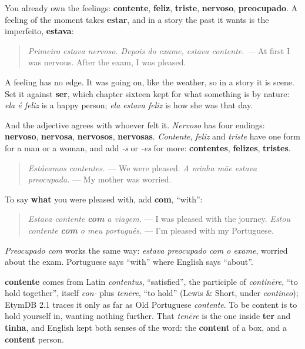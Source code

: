 \begin{grammarlens}[title={Grammar Lens: a feeling is scene, and it takes estar}]
You already own the feelings: \textbf{contente}, \textbf{feliz}, \textbf{triste}, \textbf{nervoso}, \textbf{preocupado}. A feeling of the moment takes \textbf{estar}, and in a story the past it wants is the imperfeito, \textbf{estava}:

\begin{quote}
\emph{Primeiro estava nervoso. Depois do exame, estava contente.} — At first I was nervous. After the exam, I was pleased.
\end{quote}

A feeling has no edge. It was going on, like the weather, so in a story it is scene. Set it against \textbf{ser}, which chapter sixteen kept for what something is by nature: \emph{ela é feliz} is a happy person; \emph{ela estava feliz} is how she was that day.

And the adjective agrees with whoever felt it. \emph{Nervoso} has four endings: \textbf{nervoso}, \textbf{nervosa}, \textbf{nervosos}, \textbf{nervosas}. \emph{Contente}, \emph{feliz} and \emph{triste} have one form for a man or a woman, and add \emph{-s} or \emph{-es} for more: \textbf{contentes}, \textbf{felizes}, \textbf{tristes}.

\begin{quote}
\emph{Estávamos contentes.} — We were pleased. \emph{A minha mãe estava preocupada.} — My mother was worried.
\end{quote}
\end{grammarlens}

\begin{grammarlens}[title={Grammar Lens: contente com}]
To say \textbf{what} you were pleased with, add \textbf{com}, \textquotedblleft{}with\textquotedblright{}:

\begin{quote}
\emph{Estava contente \textbf{com} a viagem.} — I was pleased with the journey. \emph{Estou contente \textbf{com} o meu português.} — I'm pleased with my Portuguese.
\end{quote}

\emph{Preocupado com} works the same way: \emph{estava preocupado com o exame}, worried about the exam. Portuguese says \textquotedblleft{}with\textquotedblright{} where English says \textquotedblleft{}about\textquotedblright{}.
\end{grammarlens}

\begin{cousinweb}
\textbf{contente} comes from Latin \emph{contentus}, \textquotedblleft{}satisfied\textquotedblright{}, the participle of \emph{continēre}, \textquotedblleft{}to hold together\textquotedblright{}, itself \emph{con-} plus \emph{tenēre}, \textquotedblleft{}to hold\textquotedblright{} (Lewis \& Short, under \emph{contineo}); EtymDB 2.1 traces it only as far as Old Portuguese \emph{contente}. To be content is to hold yourself in, wanting nothing further. That \emph{tenēre} is the one inside \textbf{ter} and \textbf{tinha}, and English kept both senses of the word: the \textbf{content} of a box, and a \textbf{content} person.
\end{cousinweb}


